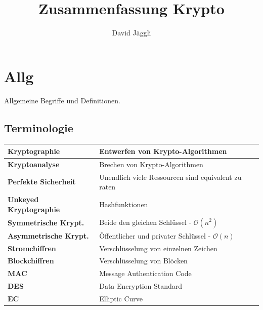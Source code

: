 \documentclass[12pt]{scrartcl}
\author{David Jäggli}
\title{Zusammenfassung Krypto}
\begin{document}
\maketitle

\tableofcontents

\newpage
\section{Allg}

Allgemeine Begriffe und Definitionen.


\subsection{Terminologie}


\renewcommand{\arraystretch}{1.5}
\begin{center}
    \begin{tabular}{ | m{12em} | m{25em} | }
        \hline
        \textbf{Kryptographie}          & Entwerfen von Krypto-Algorithmen                          \\
        \hline
        \textbf{Kryptoanalyse}          & Brechen von Krypto-Algorithmen                            \\
        \hline
        \textbf{Perfekte Sicherheit}    & Unendlich viele Ressourcen sind equivalent zu raten       \\
        \hline
        \textbf{Unkeyed Kryptographie}  & Hashfunktionen                                            \\
        \hline
        \textbf{Symmetrische Krypt.}    & Beide den gleichen Schlüssel - $\mathcal{O}(n^2)$         \\
        \hline
        \textbf{Asymmetrische Krypt.}   & Öffentlicher und privater Schlüssel - $\mathcal{O}(n)$    \\
        \hline
        \textbf{Stromchiffren}          & Verschlüsselung von einzelnen Zeichen                     \\
        \hline
        \textbf{Blockchiffren}          & Verschlüsselung von Blöcken                               \\
        \hline
        \textbf{MAC}                    & Message Authentication Code                               \\
        \hline
        \textbf{DES}                    & Data Encryption Standard                                  \\
        \hline
        \textbf{EC}                     & Elliptic Curve                                            \\

\end{tabular}
\end{center}
\end{document}
